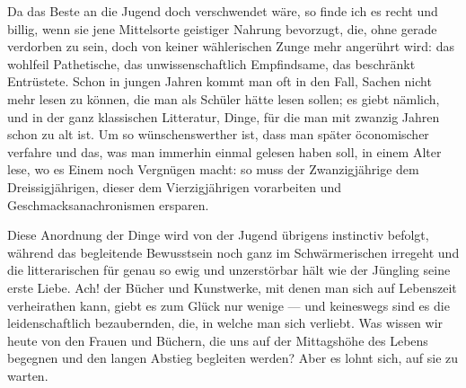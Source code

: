 Da das Beste an die Jugend doch verschwendet wäre, so finde ich es recht und billig, wenn sie jene Mittelsorte geistiger Nahrung bevorzugt, die, ohne gerade verdorben zu sein, doch von keiner wählerischen Zunge mehr angerührt wird: das wohlfeil Pathetische, das unwissenschaftlich Empfindsame, das beschränkt Entrüstete. Schon in jungen Jahren kommt man oft in den Fall, Sachen nicht mehr lesen zu können, die man als Schüler hätte lesen sollen; es giebt nämlich, und in der ganz klassischen Litteratur, Dinge, für die man mit zwanzig Jahren schon zu alt ist. Um so wünschenswerther ist, dass man später öconomischer verfahre und das, was man immerhin einmal gelesen haben soll, in einem Alter lese, wo es Einem noch Vergnügen macht: so muss der Zwanzigjährige dem Dreissigjährigen, dieser dem Vierzigjährigen vorarbeiten und Geschmacksanachronismen ersparen.
\par

Diese Anordnung der Dinge wird von der Jugend übrigens instinctiv befolgt, während das begleitende Bewusstsein noch ganz im Schwärmerischen irregeht und die litterarischen  für genau so ewig und unzerstörbar hält wie der Jüngling seine erste Liebe. Ach! der Bücher und Kunstwerke, mit denen man sich auf Lebenszeit verheirathen kann, giebt es zum Glück nur wenige — und keineswegs sind es die leidenschaftlich bezaubernden, die, in welche man sich  verliebt. Was wissen wir heute von den Frauen und Büchern, die uns auf der Mittagshöhe des Lebens begegnen und den langen Abstieg begleiten werden? Aber es lohnt sich, auf sie zu warten.
\par

